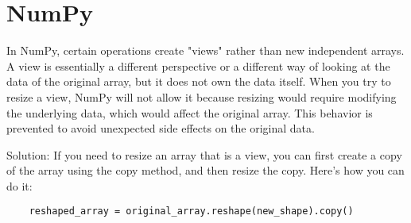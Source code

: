 \documentclass[a4paper,12pt]{article} %
\begin{document}
\section{\textbf{NumPy}}
In NumPy, certain operations create "views" rather than new independent arrays. 
A view is essentially a different perspective or a different way of looking at the data of the original array, but it does not own the data itself.
When you try to resize a view, NumPy will not allow it because resizing would require modifying the underlying data, which would affect the original array. This behavior is prevented to avoid unexpected side effects on the original data.

Solution: If you need to resize an array that is a view, you can first create a copy of the array using the copy method, and then resize the copy. Here's how you can do it:
\begin{verbatim}
    reshaped_array = original_array.reshape(new_shape).copy()
\end{verbatim}
\end{document}
